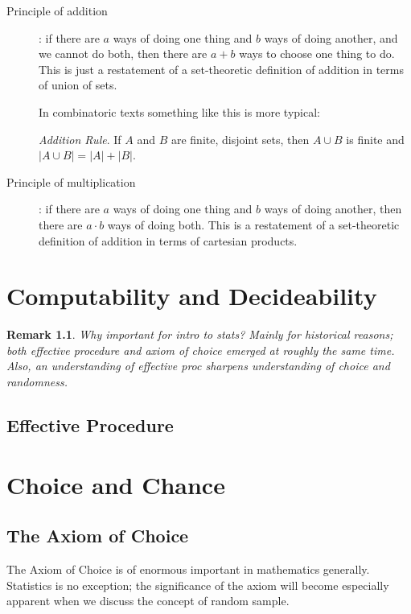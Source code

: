 \documentclass[reqno,12pt]{tufte-book}
\numberwithin{equation}{subsection}
\newtheorem{remark}{Remark}
\begin{document}
\begin{description}
\item [Principle of addition]: if there are $a$ ways of doing one thing
  and $b$ ways of doing another, and we cannot do both, then there are
  $a+b$ ways to choose one thing to do.  This is just a restatement of
  a set-theoretic definition of addition in terms of union of sets.

  In combinatoric texts something like this is more typical:

  \textit{Addition Rule}. If $A$ and $B$ are finite, disjoint sets,
  then $A \cup B$ is finite and $|A \cup B| = |A| + |B|$.

\item [Principle of multiplication]: if there are $a$ ways of doing
  one thing and $b$ ways of doing another, then there are $a\cdot b$
  ways of doing both.  This is a restatement of a set-theoretic
  definition of addition in terms of cartesian products.
\end{description}

\chapter{Computability and Decideability}

\begin{remark}
  Why important for intro to stats?  Mainly for historical reasons;
  both effective procedure and axiom of choice emerged at roughly the
  same time.  Also, an understanding of effective proc sharpens
  understanding of choice and randomness.
\end{remark}

\section{Effective Procedure}


\chapter{Choice and Chance}

\section{The Axiom of Choice}

The Axiom of Choice is of enormous important in mathematics generally.
Statistics is no exception; the significance of the axiom will become
especially apparent when we discuss the concept of random sample.
\end{document}
